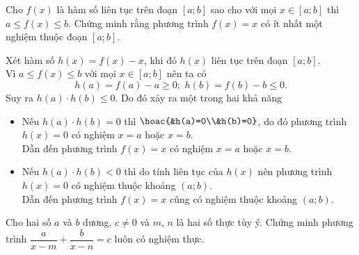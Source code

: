 \begin{bt}%
	Cho $f(x)$ là hàm số liên tục trên đoạn $\left[a;b\right]$ sao cho với mọi $x\in \left[a;b\right]$ thì $a\le f(x)\le b$. Chứng minh rằng phương trình $f(x)=x$ có ít nhất một nghiệm thuộc đoạn $\left[a;b\right]$.
	\loigiai
	{Xét hàm số $h(x)=f(x)-x$, khi đó $h(x)$ liên tục trên đoạn $\left[a;b\right]$.\\
		Vì $a\le f(x)\le b$ với mọi $x\in \left[a;b\right]$ nên ta có $$h(a)=f(a)-a\geq 0;\,\,h(b)=f(b)-b\le 0.$$
		Suy ra $h(a)\cdot h(b)\le 0$. Do đó xảy ra một trong hai khả năng
		\begin{itemize}
			\item[•] Nếu $h(a)\cdot h(b)=0$ thì $\hoac{&h(a)=0\\&h(b)=0}$, do đó phương trình $h(x)=0$ có nghiệm $x=a$ hoặc $x=b$.\\
			Dẫn đến phương trình $f(x)=x$ có nghiệm $x=a$ hoặc $x=b$.
			\item[•] Nếu $h(a)\cdot h(b)<0$ thì do tính liên tục của $h(x)$ nên phương trình $h(x)=0$ có nghiệm thuộc khoảng $(a;b)$.\\
			Dẫn đến phương trình $f(x)=x$ cũng có nghiệm thuộc khoảng $(a;b)$.
		\end{itemize}
	}
\end{bt}
\begin{bt}%
	Cho hai số $a$ và $b$ dương, $c\ne 0$ và $m$, $n$ là hai số thực tùy ý. Chứng minh phương trình $\dfrac{a}{x-m}+\dfrac{b}{x-n}=c$ luôn có nghiệm thực.
\end{bt}
